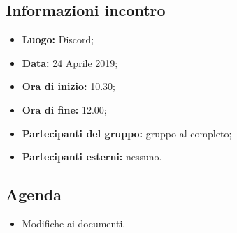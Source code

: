 \subsection{Informazioni incontro}
\begin{itemize}
	\item { \textbf{Luogo:} Discord};
	\item { \textbf{Data:} 24 Aprile 2019};
	\item { \textbf{Ora di inizio:} 10.30};
	\item { \textbf{Ora di fine:} 12.00};
	\item { \textbf{Partecipanti del gruppo:} gruppo al completo};
	\item { \textbf{Partecipanti esterni:} nessuno}.
\end{itemize}


\subsection{Agenda}
\begin{itemize}
	\item {Modifiche ai documenti.}
\end{itemize}

